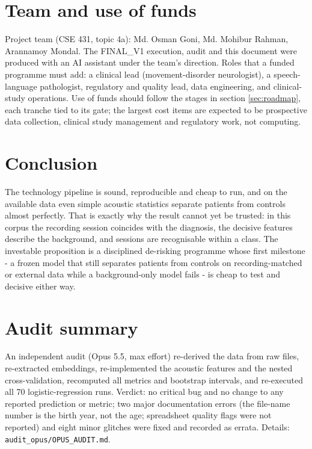 \documentclass[10pt,a4paper]{article}
\begin{document}
\section{Team and use of funds}\label{sec:team}
Project team (CSE 431, topic 4a): Md. Osman Goni, Md. Mohibur Rahman, Arannamoy Mondal. The FINAL\_V1 execution, audit and this document were produced with an AI assistant under the team's direction. Roles that a funded programme must add: a clinical lead (movement-disorder neurologist), a speech-language pathologist, regulatory and quality lead, data engineering, and clinical-study operations. Use of funds should follow the stages in section \ref{sec:roadmap}, each tranche tied to its gate; the largest cost items are expected to be prospective data collection, clinical study management and regulatory work, not computing.
\section{Conclusion}\label{sec:conclusion}
The technology pipeline is sound, reproducible and cheap to run, and on the available data even simple acoustic statistics separate patients from controls almost perfectly. That is exactly why the result cannot yet be trusted: in this corpus the recording session coincides with the diagnosis, the decisive features describe the background, and sessions are recognisable within a class. The investable proposition is a disciplined de-risking programme whose first milestone - a frozen model that still separates patients from controls on recording-matched or external data while a background-only model fails - is cheap to test and decisive either way.
\appendix\section{Audit summary}
An independent audit (Opus 5.5, max effort) re-derived the data from raw files, re-extracted embeddings, re-implemented the acoustic features and the nested cross-validation, recomputed all metrics and bootstrap intervals, and re-executed all 70 logistic-regression runs. Verdict: no critical bug and no change to any reported prediction or metric; two major documentation errors (the file-name number is the birth year, not the age; spreadsheet quality flags were not reported) and eight minor glitches were fixed and recorded as errata. Details: \texttt{audit\_opus/OPUS\_AUDIT.md}.
\end{document}
